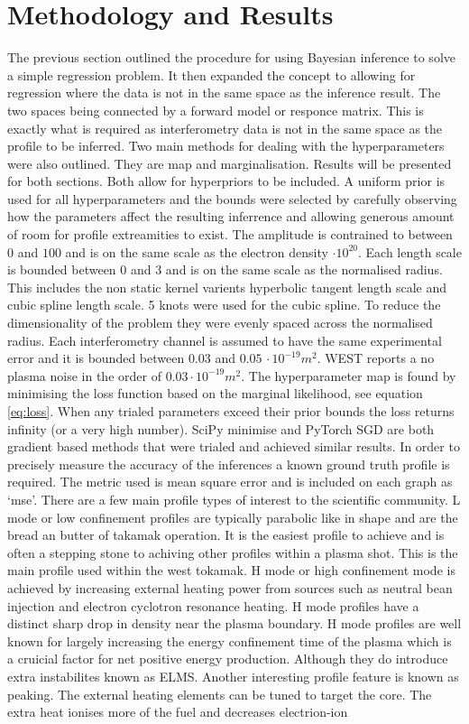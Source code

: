 \chapter{Methodology and Results}

The previous section outlined the procedure for using Bayesian inference to solve a simple regression problem. It then expanded the concept to allowing for regression where the data is not in the same space as the inference result. The two spaces being connected by a forward model or responce matrix. This is exactly what is required as interferometry data is not in the same space as the profile to be inferred. Two main methods for dealing with the hyperparameters were also outlined. They are \gls{map} and marginalisation. Results will be presented for both sections. Both allow for hyperpriors to be included. A uniform prior is used for all hyperparameters and the bounds were selected by carefully observing how the parameters affect the resulting inferrence and allowing generous amount of room for profile extreamities to exist. The amplitude is contrained to between $0$ and $100$ and is on the same scale as the electron density $\cdot 10^{20}$. Each length scale is bounded between 0 and 3 and is on the same scale as the normalised radius. This includes the non static kernel varients hyperbolic tangent length scale and cubic spline length scale. 5 knots were used for the cubic spline. To reduce the dimensionality of the problem they were evenly spaced across the normalised radius. Each interferometry channel is assumed to have the same experimental error and it is bounded between $0.03$ and $0.05 \, \cdot10^{-19}m^2$. WEST reports a no plasma noise in the order of $0.03 \cdot10^{-19}m^2$. The hyperparameter \gls{map} is found by minimising the loss function based on the marginal likelihood, see equation \ref{eq:loss}. When any trialed parameters exceed their prior bounds the loss returns infinity (or a very high number). SciPy minimise and PyTorch SGD are both gradient based methods that were trialed and achieved similar results. In order to precisely measure the accuracy of the inferences a known ground truth profile is required. The metric used is mean square error and is included on each graph as `mse'. There are a few main profile types of interest to the scientific community. L mode or low confinement profiles are typically parabolic like in shape and are the bread an butter of takamak operation. It is the easiest profile to achieve and is often a stepping stone to achiving other profiles within a plasma shot. This is the main profile used within the \gls{west} tokamak. H mode or high confinement mode is achieved by increasing external heating power from sources such as neutral bean injection and electron cyclotron resonance heating. H mode profiles have a distinct sharp drop in density near the plasma boundary. H mode profiles are well known for largely increasing the energy confinement time of the plasma which is a cruicial factor for net positive energy production. Although they do introduce extra instabilites known as ELMS. Another interesting profile feature is known as peaking. The external heating elements can be tuned to target the core. The extra heat ionises more of the fuel and decreases electrion-ion 